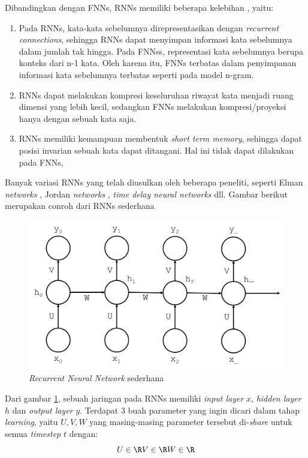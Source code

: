 Dibandingkan dengan FNNs, RNNs memiliki beberapa kelebihan \citep{mikolov2010recurrent}, yaitu:
\begin{enumerate}
	\item Pada RNNs, kata-kata sebelumnya direpresentasikan dengan \textit{recurrent connections}, sehingga RNNs dapat menyimpan informasi kata sebelumnya dalam jumlah tak hingga. Pada FNNss, representasi kata sebelumnya berupa konteks dari n-1 kata. Oleh karena itu, FNNs terbatas dalam penyimpanan informasi kata sebelumnya terbatas seperti pada model n-gram.
	\item RNNs dapat melakukan kompresi keseluruhan riwayat kata menjadi ruang dimensi yang lebih kecil, sedangkan FNNs melakukan kompresi/proyeksi hanya dengan sebuah kata saja.
	\item RNNs memiliki kemampuan membentuk \textit{short term memory}, sehingga dapat posisi invarian sebuah kata dapat ditangani. Hal ini tidak dapat dilakukan pada FNNs,
\end{enumerate}

Banyak variasi RNNs yang telah diusulkan oleh beberapa peneliti, seperti Elman \textit{networks} \citep{elman1990finding}, Jordan \textit{networks} \citep{jordan1986attractor}, \textit{time delay neural networks} \citep{lang1990time} dll. Gambar berikut merupakan conroh  dari RNNs sederhana

\begin{figure}
	\centering
	\includegraphics[width=0.80\linewidth]{images/simple_rnn}
	\caption{\textit{Recurrent Neural Network} sederhana}
	\label{fig:simple_rnn}
\end{figure}

Dari gambar \ref{fig:simple_rnn}, sebuah jaringan pada RNNs memiliki \textit{input layer} $ x $, \textit{hidden layer} $ h $ dan \textit{output layer} $ y $. Terdapat 3 buah parameter yang ingin dicari dalam tahap \textit{learning}, yaitu $ {U, V, W} $ yang masing-masing parameter tersebut di-\textit{share} untuk semua \textit{timestep} $ t $ dengan:
\begin{equation}
U \in \R
V \in \R
W \in \R
\end{equation}


